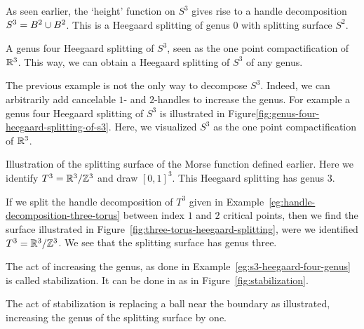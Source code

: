 \begin{eg}
    As seen earlier, the `height' function on $S^{3}$ gives rise to a handle decomposition $S^{3} = B^{2} \cup B^{2}$. This is a Heegaard splitting of genus $0$ with splitting surface $S^{2}$.
\end{eg}
\begin{eg}
    \begin{marginfigure}
        \centering
        \caption{A genus four Heegaard splitting of $S^{3}$, seen as the one point compactification of $\mathbb{R}^3$.
            This way, we can obtain a Heegaard splitting of $S^{3}$ of any genus.
        }
        \label{fig:genus-four-heegaard-splitting-of-s3}
    \end{marginfigure}
    The previous example is not the only way to decompose $S^{3}$.
    Indeed, we can arbitrarily add cancelable $1$- and $2$-handles to increase the genus. 
    For example a genus four Heegaard splitting of $S^{3}$ is illustrated in Figure\ref{fig:genus-four-heegaard-splitting-of-s3}.
    Here, we visualized $S^{3}$ as the one point compactification of $\mathbb{R}^3$.
    \label{eg:s3-heegaard-four-genus}
\end{eg}
\begin{marginfigure}
    \centering
    \caption{
        Illustration of the splitting surface of the Morse function defined earlier.
        Here we identify $T^{3} = \mathbb{R}^3 / \mathbb{Z}^3$ and draw $[0,1]^3$.
        This Heegaard splitting has genus $3$.
    }
    \label{fig:three-torus-heegaard-splitting}
\end{marginfigure}
\begin{eg}
    If we split the handle decomposition of $T^{3}$ given in Example~\ref{eg:handle-decomposition-three-torus} between index $1$ and $2$ critical points, then we find the surface illustrated in Figure~\ref{fig:three-torus-heegaard-splitting}, were we identified $T^{3} = \mathbb{R}^3 / \mathbb{Z}^{3}$.
    We see that the splitting surface has genus three.
\end{eg}


The act of increasing the genus, as done in Example~\ref{eg:s3-heegaard-four-genus} is called stabilization.
It can be done in as in Figure~\ref{fig:stabilization}.

\begin{marginfigure}
    \centering
    \caption{
        The act of stabilization is replacing a ball near the boundary as illustrated, increasing the genus of the splitting surface by one.}
    \label{fig:stabilization}
\end{marginfigure}
